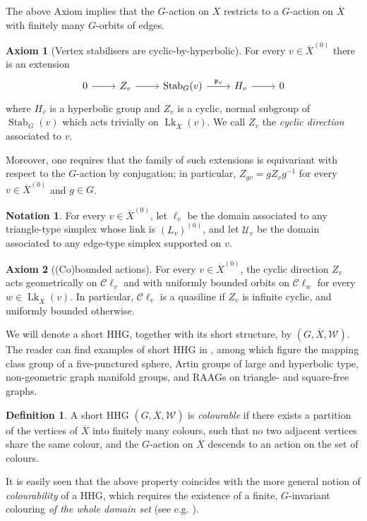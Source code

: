 \documentclass[svgnames]{amsart}
\theoremstyle{plain}
\theoremstyle{definition}
\newtheorem{defn}[thm]{Definition}
\newtheorem{notation}[thm]{Notation}
\newtheorem{ax}{Axiom}
\newcommand{\C}{\mathcal C}
\newcommand{\ov}[1]{\overline{#1}}
\newcommand{\U}{\mathcal{U}}
\newcommand{\link}{\operatorname{Lk}}
\newcommand{\Stab}[2]{\operatorname{Stab}_{#1}(#2)}
\newcommand{\W}{\mathcal{W}}
\newcommand{\p}{\mathfrak{p}}
\begin{document}
The above Axiom implies that the $G$-action on $X$ restricts to a $G$-action on $\ov X$ with finitely many $G$-orbits of edges.

\begin{ax}[Vertex stabilisers are cyclic-by-hyperbolic]\label{short_axiom:extension}
    For every $v\in\ov{X}^{(0)}$ there is an extension
        $$\begin{tikzcd}
        0\ar{r}&Z_v\ar{r}&\Stab{G}{v}\ar{r}{\p_v}&H_v\ar{r}&0
        \end{tikzcd}$$
        where $H_v$ is a hyperbolic group and $Z_v$ is a cyclic, normal subgroup of $\Stab{G}{v}$ which acts trivially on $\link_{\ov{X}}(v)$. We call $Z_v$ the \emph{cyclic direction} associated to $v$.
        
        Moreover, one requires that the family of such extensions is equivariant with respect to the $G$-action by conjugation; in particular, $Z_{gv}=gZ_vg^{-1}$ for every $v\in \ov{X}^{(0)}$ and $g\in G$.
\end{ax}


\begin{notation}\label{notation:lv_Uv}
    For every $v\in \ov{X}^{(0)}$, let $\ell_v$ be the domain associated to any triangle-type simplex whose link is $(L_v)^{(0)}$, and let $\U_v$ be the domain associated to any edge-type simplex supported on $v$.
\end{notation}

\begin{ax}[(Co)bounded actions]\label{short_axiom:cobounded}
For every $v\in \ov{X}^{(0)}$, the cyclic direction $Z_v$ acts geometrically on $\C\ell_v$ and with uniformly bounded orbits on $\C\ell_w$ for every $w\in\link_{\ov X}(v)$. In particular, $\C\ell_v$ is a quasiline if $Z_v$ is infinite cyclic, and uniformly bounded otherwise.
\end{ax}



We will denote a short HHG, together with its short structure, by $(G, \ov X, \W)$. The reader can find examples of short HHG in \cite[Sections 2.3 and 6]{Short_HHG:I}, among which figure the mapping class group of a five-punctured sphere, Artin groups of large and hyperbolic type, non-geometric graph manifold groups, and RAAGs on triangle- and square-free graphs.


\begin{defn}\label{defn:colourable}
    A short HHG $(G, \ov X, \W)$ is \emph{colourable} if there exists a partition of the vertices of $\ov{X}$ into finitely many colours, such that no two adjacent vertices share the same colour, and the $G$-action on $\ov X$ descends to an action on the set of colours.
\end{defn}
It is easily seen that the above property coincides with the more general notion of \emph{colourability} of a HHG, which requires the existence of a finite, $G$-invariant colouring \emph{of the whole domain set} (see e.g. \cite[Definition 4.15]{barak2024equational}).
\end{document}
